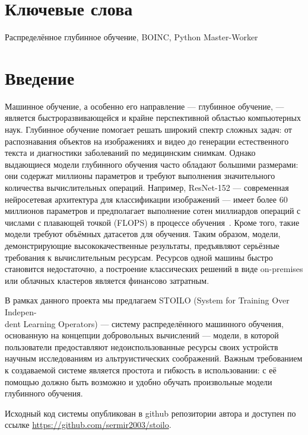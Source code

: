 \documentclass[a4paper,12pt]{extarticle}
\begin{document}

\section*{Ключевые слова}
Распределённое глубинное обучение, BOINC, Python Master-Worker

\pagebreak

\section{Введение}

Машинное обучение, а особенно его направление — глубинное обучение, — является быстроразвивающейся и крайне перспективной областью компьютерных наук.
Глубинное обучение помогает решать широкий спектр сложных задач: от распознавания объектов на изображениях и видео до генерации естественного текста и диагностики заболеваний по медицинским снимкам.
Однако выдающиеся модели глубинного обучения часто обладают большими размерами: они содержат миллионы параметров и требуют выполнения значительного количества вычислительных операций.
Например, ResNet-152 — современная нейросетевая архитектура для классификации изображений — имеет более 60 миллионов параметров и предполагает выполнение сотен миллиардов операций с числами с плавающей точкой (FLOPS) в процессе обучения~\cite{he2015deepresidual}.
Кроме того, такие модели требуют объёмных датасетов для обучения. Таким образом, модели, демонстрирующие высококачественные результаты, предъявляют серьёзные требования к вычислительным ресурсам. Ресурсов одной машины быстро становится недостаточно, а построение классических решений в виде on-premises или облачных кластеров является финансово затратным.

В рамках данного проекта мы предлагаем STOILO (System for Training Over Indepen-\\dent Learning Operators) — систему распределённого машинного обучения, основанную на концепции добровольных вычислений — модели, в которой пользователи предоставляют недоиспользованные ресурсы своих устройств научным исследованиям из альтруистических соображений.
Важным требованием к создаваемой системе является простота и гибкость в использовании: с её помощью должно быть возможно и удобно обучать произвольные модели глубинного обучения.

Исходный код системы опубликован в github репозитории автора и доступен по ссылке \url{https://github.com/sermir2003/stoilo}.
\end{document}
